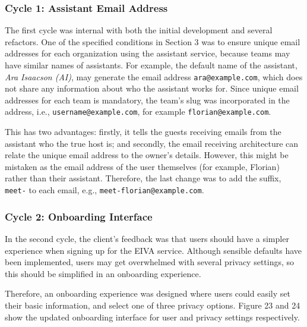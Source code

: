 \documentclass{article}
\begin{document}
\subsubsection{Cycle 1: Assistant Email Address}

The first cycle was internal with both the initial development and several refactors. One of the specified conditions in Section 3 was to ensure unique email addresses for each organization using the assistant service, because teams may have similar names of assistants. For example, the default name of the assistant, \emph{Ara Isaacson (AI)}, may generate the email address \texttt{ara@example.com}, which does not share any information about who the assistant works for. Since unique email addresses for each team is mandatory, the team's slug was incorporated in the address, i.e., \texttt{username@example.com}, for example \texttt{florian@example.com}. 

This has two advantages: firstly, it tells the guests receiving emails from the assistant who the true host is; and secondly, the email receiving architecture can relate the unique email address to the owner's details. However, this might be mistaken as the email address of the user themselves (for example, Florian) rather than their assistant. Therefore, the last change was to add the suffix, \texttt{meet-} to each email, e.g., \texttt{meet-florian@example.com}.

\subsubsection{Cycle 2: Onboarding Interface}

In the second cycle, the client's feedback was that users should have a simpler experience when signing up for the EIVA service. Although sensible defaults have been implemented, users may get overwhelmed with several privacy settings, so this should be simplified in an onboarding experience.

Therefore, an onboarding experience was designed where users could easily set their basic information, and select one of three privacy options. Figure 23 and 24 show the updated onboarding interface for user and privacy settings respectively.
\end{document}
